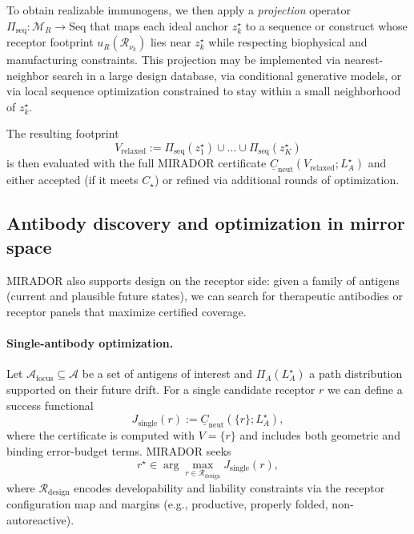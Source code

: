 \documentclass[11pt]{article}
\begin{document}
To obtain realizable immunogens, we then apply a \emph{projection} operator
$\Pi_{\mathrm{seq}} : \mathcal{M}_R \to \text{Seq}$ that maps each ideal anchor $z_k^\star$ to a
sequence or construct whose receptor footprint $u_R(\mathcal{R}_{\nu_k})$ lies near $z_k^\star$
while respecting biophysical and manufacturing constraints. This projection may be implemented
via nearest-neighbor search in a large design database, via conditional generative models, or via
local sequence optimization constrained to stay within a small neighborhood of $z_k^\star$.

The resulting footprint
\[
  V_{\mathrm{relaxed}} := \Pi_{\mathrm{seq}}(z_1^\star) \cup \dots \cup \Pi_{\mathrm{seq}}(z_K^\star)
\]
is then evaluated with the full MIRADOR certificate
$\underline{C}_{\mathrm{neut}}(V_{\mathrm{relaxed}};L_A^\star)$ and either accepted (if it meets
$C_\star$) or refined via additional rounds of optimization.

\subsection{Antibody discovery and optimization in mirror space}
\label{subsec:antibody-design}

MIRADOR also supports design on the receptor side: given a family of antigens (current and
plausible future states), we can search for therapeutic antibodies or receptor panels that maximize
certified coverage.

\paragraph{Single-antibody optimization.}
Let $\mathcal{A}_{\mathrm{focus}} \subseteq \mathcal{A}$ be a set of antigens of interest and
$\Pi_A(L_A^\star)$ a path distribution supported on their future drift. For a single candidate
receptor $r$ we can define a success functional
\begin{equation}
  J_{\mathrm{single}}(r)
  := \underline{C}_{\mathrm{neut}}(\{r\};L_A^\star),
\end{equation}
where the certificate is computed with $V = \{r\}$ and includes both geometric and binding
error-budget terms. MIRADOR seeks
\[
  r^\star \in \arg\max_{r \in \mathcal{R}_{\mathrm{design}}} J_{\mathrm{single}}(r),
\]
where $\mathcal{R}_{\mathrm{design}}$ encodes developability and liability constraints via the
receptor configuration map and margins (e.g., productive, properly folded, non-autoreactive).
\end{document}
